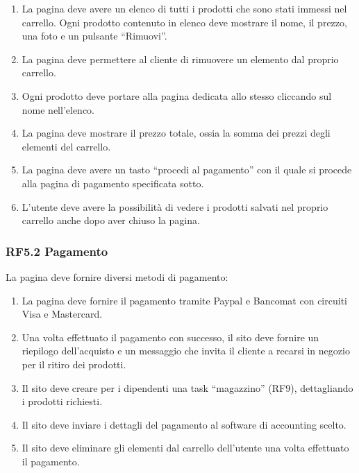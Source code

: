 \documentclass{report}
\begin{document}
\begin{enumerate}
	\item La pagina deve avere un elenco di tutti i prodotti che sono stati immessi nel carrello. Ogni prodotto contenuto in elenco deve mostrare il nome, il prezzo, una foto e un pulsante “Rimuovi”.
	
	\item La pagina deve permettere al cliente di rimuovere un elemento dal proprio carrello. %

	\item Ogni prodotto deve portare alla pagina dedicata allo stesso cliccando sul nome nell’elenco.
	
	\item La pagina deve mostrare il prezzo totale, ossia la somma dei prezzi degli elementi del carrello.

	\item La pagina deve avere un tasto “procedi al pagamento” con il quale si procede alla pagina di pagamento specificata sotto.
	
	\item L'utente deve avere la possibilità di vedere i prodotti salvati nel proprio carrello anche dopo aver chiuso la pagina.

\end{enumerate}

\subsubsection*{RF5.2 Pagamento}
La pagina deve fornire diversi metodi di pagamento:

\begin{enumerate}

	\item La pagina deve fornire il pagamento tramite Paypal e Bancomat con circuiti Visa e Mastercard.

	\item Una volta effettuato il pagamento con successo, il sito deve fornire un riepilogo dell’acquisto e un messaggio che invita il cliente a recarsi in negozio per il ritiro dei prodotti.
	\item Il sito deve creare per i dipendenti una task “magazzino” (RF9), dettagliando i prodotti richiesti.
	\item Il sito deve inviare i dettagli del pagamento al software di accounting scelto.
	\item Il sito deve eliminare gli elementi dal carrello dell’utente una volta effettuato il pagamento.
\end{enumerate}
\end{document}
